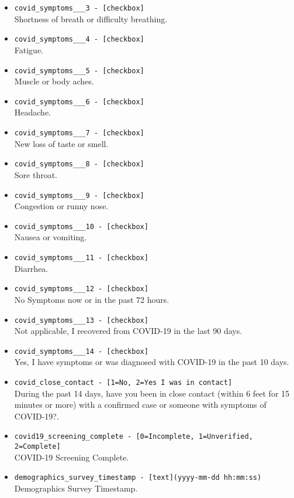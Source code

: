 \begin{description}
\begin{addmargin}[0em]{0em}
\begin{addmargin}[1em]{0em}
\begin{itemize}
            \item \verb|covid_symptoms___3 - [checkbox]|\\Shortness of breath or difficulty breathing.
            \item \verb|covid_symptoms___4 - [checkbox]|\\Fatigue.
            \item \verb|covid_symptoms___5 - [checkbox]|\\Muscle or body aches.
            \item \verb|covid_symptoms___6 - [checkbox]|\\Headache.
            \item \verb|covid_symptoms___7 - [checkbox]|\\New loss of taste or smell.
            \item \verb|covid_symptoms___8 - [checkbox]|\\Sore throat.
            \item \verb|covid_symptoms___9 - [checkbox]|\\Congestion or runny nose.
            \item \verb|covid_symptoms___10 - [checkbox]|\\Nausea or vomiting.
            \item \verb|covid_symptoms___11 - [checkbox]|\\Diarrhea.
            \item \verb|covid_symptoms___12 - [checkbox]|\\No Symptoms now or in the past 72 hours.
            \item \verb|covid_symptoms___13 - [checkbox]|\\Not applicable, I recovered from COVID-19 in the last 90 days.
            \item \verb|covid_symptoms___14 - [checkbox]|\\Yes, I have symptoms or was diagnosed with COVID-19 in the past 10 days.
            \item \verb|covid_close_contact - [1=No, 2=Yes I was in contact]|\\During the past 14 days, have you been in close contact (within 6 feet for 15 minutes or more) with a confirmed case or someone with symptoms of COVID-19?.
            \item \verb|covid19_screening_complete - [0=Incomplete, 1=Unverified, 2=Complete]|\\COVID-19 Screening Complete.
            \item \verb|demographics_survey_timestamp - [text](yyyy-mm-dd hh:mm:ss)|\\Demographics Survey Timestamp.

\end{itemize}
\end{addmargin}
\end{addmargin}
\end{description}
